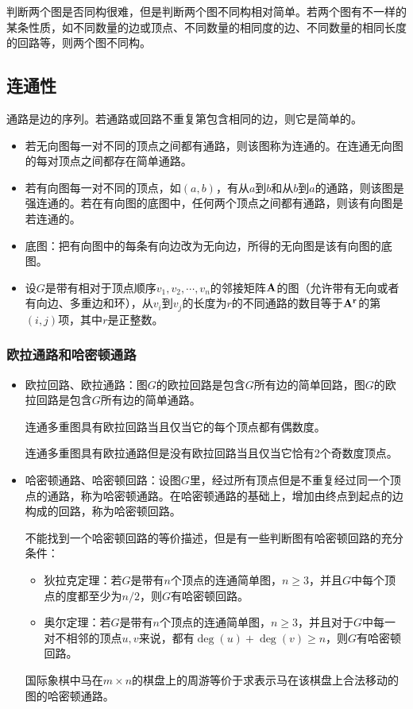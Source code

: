 判断两个图是否同构很难，但是判断两个图不同构相对简单。若两个图有不一样的某条性质，如不同数量的边或顶点、不同数量的相同度的边、不同数量的相同长度的回路等，则两个图不同构。

\subsection{连通性}
通路是边的序列。若通路或回路不重复第包含相同的边，则它是简单的。

\begin{itemize}
    \item 若无向图每一对不同的顶点之间都有通路，则该图称为连通的。在连通无向图的每对顶点之间都存在简单通路。
    \item 若有向图每一对不同的顶点，如$(a,b)$，有从$a$到$b$和从$b$到$a$的通路，则该图是强连通的。若在有向图的底图中，任何两个顶点之间都有通路，则该有向图是若连通的。
    \item 底图：把有向图中的每条有向边改为无向边，所得的无向图是该有向图的底图。
    \item 设$G$是带有相对于顶点顺序$v_1,v_2,\cdots,v_n$的邻接矩阵$\bf A$的图（允许带有无向或者有向边、多重边和环），从$v_i$到$v_j$的长度为$r$的不同通路的数目等于$\bf A^r$的第$(i,j)$项，其中$r$是正整数。
\end{itemize}

\subsubsection*{欧拉通路和哈密顿通路}
\begin{itemize}
    \item 欧拉回路、欧拉通路：图$G$的欧拉回路是包含$G$所有边的简单回路，图$G$的欧拉回路是包含$G$所有边的简单通路。
    
    连通多重图具有欧拉回路当且仅当它的每个顶点都有偶数度。

    连通多重图具有欧拉通路但是没有欧拉回路当且仅当它恰有2个奇数度顶点。

    \item 哈密顿通路、哈密顿回路：设图$G$里，经过所有顶点但是不重复经过同一个顶点的通路，称为哈密顿通路。在哈密顿通路的基础上，增加由终点到起点的边构成的回路，称为哈密顿回路。

    不能找到一个哈密顿回路的等价描述，但是有一些判断图有哈密顿回路的充分条件：
    \begin{itemize}
        \item 狄拉克定理：若$G$是带有$n$个顶点的连通简单图，$n \ge 3$，并且$G$中每个顶点的度都至少为$n/2$，则$G$有哈密顿回路。
        \item 奥尔定理：若$G$是带有$n$个顶点的连通简单图，$n \ge 3$，并且对于$G$中每一对不相邻的顶点$u,v$来说，都有$\deg (u) + \deg (v) \ge n$，则$G$有哈密顿回路。
    \end{itemize}
    
    国际象棋中马在$m \times n$的棋盘上的周游等价于求表示马在该棋盘上合法移动的图的哈密顿通路。
\end{itemize}

